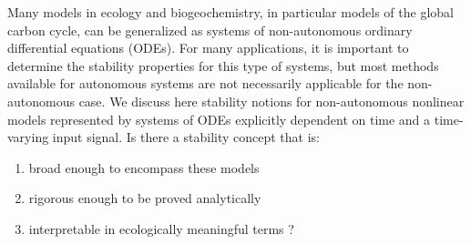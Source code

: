 
\noindent
Many models in ecology and biogeochemistry, in particular models of the global
carbon cycle, can be generalized as systems of non-autonomous ordinary
differential equations (ODEs). For many applications, it is important to
determine the stability properties for this type of systems, but most methods
available for autonomous systems are not necessarily applicable for the
non-autonomous case.  We discuss here stability notions for non-autonomous
nonlinear models represented by systems of ODEs explicitly dependent on time
and a time-varying input signal.  
Is there a stability concept that is:
\begin{enumerate}
	\item
	broad enough to encompass these models
	\item
	rigorous enough to be proved analytically 
	\item
	interpretable in ecologically meaningful terms ?
\end{enumerate}
